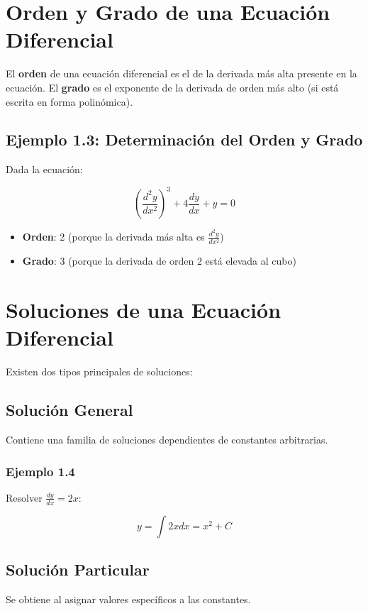 \section{Orden y Grado de una Ecuación Diferencial}
El \textbf{orden} de una ecuación diferencial es el de la derivada más alta presente en la ecuación.  
El \textbf{grado} es el exponente de la derivada de orden más alto (si está escrita en forma polinómica).

\subsection*{Ejemplo 1.3: Determinación del Orden y Grado}
Dada la ecuación:

\begin{equation}
\left( \frac{d^2y}{dx^2} \right)^3 + 4\frac{dy}{dx} + y = 0
\end{equation}

\begin{itemize}
    \item \textbf{Orden}: 2 (porque la derivada más alta es \( \frac{d^2y}{dx^2} \))
    \item \textbf{Grado}: 3 (porque la derivada de orden 2 está elevada al cubo)
\end{itemize}

\section{Soluciones de una Ecuación Diferencial}
Existen dos tipos principales de soluciones:

\subsection{Solución General}
Contiene una familia de soluciones dependientes de constantes arbitrarias.

\subsubsection*{Ejemplo 1.4}
Resolver \( \frac{dy}{dx} = 2x \):

\begin{equation}
y = \int 2x dx = x^2 + C
\end{equation}

\subsection{Solución Particular}
Se obtiene al asignar valores específicos a las constantes.

